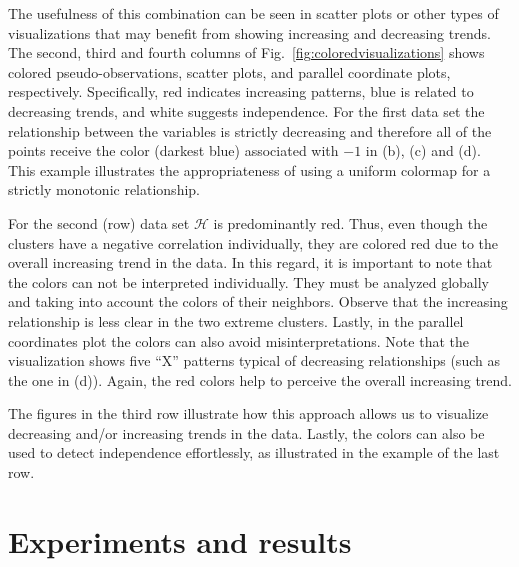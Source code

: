 \documentclass[journal]{vgtc}                %
\begin{document}
The usefulness of this combination can be seen in scatter plots or other types of visualizations that may benefit from showing increasing and decreasing trends. The second, third and fourth columns of Fig.~\ref{fig:coloredvisualizations} shows colored pseudo-observations, scatter plots, and parallel coordinate plots, respectively. Specifically, red indicates increasing patterns, blue is related to decreasing trends, and white suggests independence. For the first data set the relationship between the variables is strictly decreasing and therefore all of the points receive the color (darkest blue) associated with $-1$ in (b), (c) and (d). This example illustrates the appropriateness of using a uniform colormap for a strictly monotonic relationship. 

For the second (row) data set $\mathcal{H}$ is predominantly red. Thus, even though the clusters have a negative correlation individually, they are colored red due to the overall increasing trend in the data. In this regard, it is important to note that the colors can not be interpreted individually. They must be analyzed globally and taking into account the colors of their neighbors. Observe that the increasing relationship is less clear in the two extreme clusters. Lastly, in the parallel coordinates plot the colors can also avoid misinterpretations. Note that the visualization shows five ``X'' patterns typical of decreasing relationships (such as the one in (d)). Again, the red colors help to perceive the overall increasing trend.

The figures in the third row illustrate how this approach allows us to visualize decreasing and/or increasing trends in the data. Lastly, the colors can also be used to detect independence effortlessly, as illustrated in the example of the last row. 





\section{Experiments and results}
\label{sec:experiments}
\end{document}
